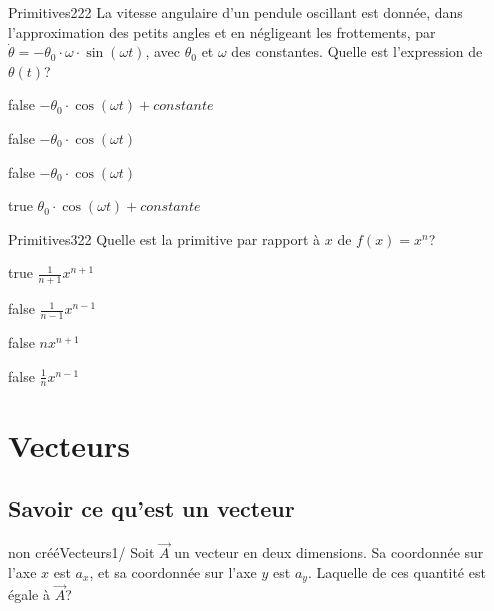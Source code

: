 \documentclass[11pt]{article}
\begin{document}
            \begin{question}{61}{Primitives}{2}{22}
                La vitesse angulaire d'un pendule oscillant est donnée, dans l'approximation des petits angles et en négligeant les frottements, par $\dot{\theta}=-\theta_0\cdot\omega\cdot\sin(\omega t)$, avec $\theta_0$ et $\omega$ des constantes. Quelle est l'expression de $\theta(t)$?
            \end{question}

			\begin{reponses}
                \item[false] $-\theta_0\cdot\cos(\omega t)+constante$
                \item[false] $-\theta_0\cdot\cos(\omega t)$
                \item[false] $-\theta_0\cdot\cos(\omega t)$
                \item[true] $\theta_0\cdot\cos(\omega t)+constante$
            \end{reponses}
        
        	\begin{question}{61}{Primitives}{3}{22}
				Quelle est la primitive par rapport à $x$ de $f(x)=x^n$?
            \end{question}

            \begin{reponses}
            	\item[true] $\frac{1}{n+1}x^{n+1}$
            	\item[false] $\frac{1}{n-1}x^{n-1}$
                \item[false] ${n}x^{n+1}$
                \item[false] $\frac{1}{n}x^{n-1}$
            \end{reponses}

    \section{Vecteurs}

        \subsection{Savoir ce qu'est un vecteur}
        
        	\begin{question}{non créé}{Vecteurs}{1}{/}
				Soit $\vec{A}$ un vecteur en deux dimensions. Sa coordonnée sur l'axe $x$ est $a_x$, et sa coordonnée sur l'axe $y$ est $a_y$. Laquelle de ces quantité est égale à $\vec{A}$?
            \end{question}
\end{document}
